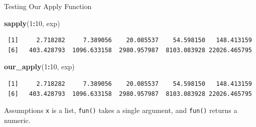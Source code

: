 \documentclass[
  ignorenonframetext,
  aspectratio=1610,
  onlytextwidth]{beamer}
\newenvironment{Shaded}{\begin{snugshade}}{\end{snugshade}}
\newcommand{\DecValTok}[1]{\textcolor[rgb]{0.00,0.00,0.81}{#1}}
\newcommand{\FunctionTok}[1]{\textcolor[rgb]{0.13,0.29,0.53}{\textbf{#1}}}
\newcommand{\NormalTok}[1]{#1}
\newcommand{\SpecialCharTok}[1]{\textcolor[rgb]{0.81,0.36,0.00}{\textbf{#1}}}
\begin{document}
\begin{frame}[fragile]{Testing Our Apply Function}
\label{testing-our-apply-function}
\begin{Shaded}
\begin{Highlighting}[]
\FunctionTok{sapply}\NormalTok{(}\DecValTok{1}\SpecialCharTok{:}\DecValTok{10}\NormalTok{, exp)}
\end{Highlighting}
\end{Shaded}

\begin{verbatim}
 [1]     2.718282     7.389056    20.085537    54.598150   148.413159
 [6]   403.428793  1096.633158  2980.957987  8103.083928 22026.465795
\end{verbatim}

\pause

\begin{Shaded}
\begin{Highlighting}[]
\FunctionTok{our\_apply}\NormalTok{(}\DecValTok{1}\SpecialCharTok{:}\DecValTok{10}\NormalTok{, exp)}
\end{Highlighting}
\end{Shaded}

\begin{verbatim}
 [1]     2.718282     7.389056    20.085537    54.598150   148.413159
 [6]   403.428793  1096.633158  2980.957987  8103.083928 22026.465795
\end{verbatim}

\pause

\begin{block}{Assumptions}
\label{assumptions}
\texttt{x} is a list, \texttt{fun()} takes a single argument, and
\texttt{fun()} returns a numeric.

\pause
\end{block}
\end{frame}
\end{document}
